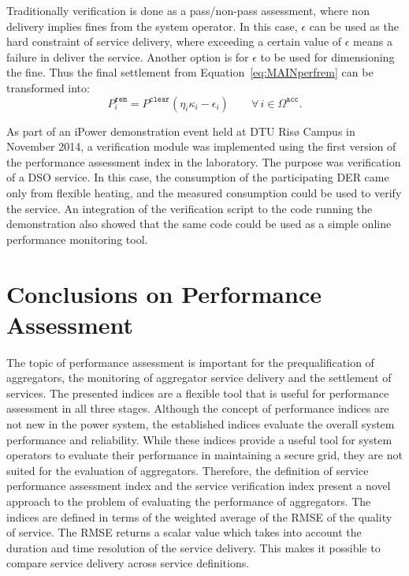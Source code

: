 Traditionally verification is done as a pass/non-pass assessment, where non delivery implies fines from the system operator. In this case, $\epsilon$ can be used as the hard constraint of service delivery, where exceeding a certain value of $\epsilon$ means a failure in deliver the service. Another option is for $\epsilon$ to be used for dimensioning the fine. Thus the final settlement from Equation~\eqref{eq:MAINperfrem} can be transformed into: 
\begin{equation}
	P^\mathtt{rem}_i = P^\mathtt{clear} \left( \eta_i\kappa_i - \epsilon_i \right)  \qquad \forall \, i \in \Omega^\mathtt{acc}.\label{eq:MAINperfrem2eps}
\end{equation}

As part of an iPower demonstration event held at DTU Risø Campus in November 2014, a verification module was implemented using the first version of the performance assessment index in the laboratory. The purpose was verification of a DSO service. In this case, the consumption of the participating DER came only from flexible heating, and the measured consumption could be used to verify the service. An integration of the verification script to the code running the demonstration also showed that the same code could be used as a simple online performance monitoring tool.

\section{Conclusions on Performance Assessment}
The topic of performance assessment is important for the prequalification of aggregators, the monitoring of aggregator service delivery and the settlement of services. The presented indices are a flexible tool that is useful for performance assessment in all three stages. Although the concept of performance indices are not new in the power system, the established indices evaluate the overall system performance and reliability. While these indices provide a useful tool for system operators to evaluate their performance in maintaining a secure grid, they are not suited for the evaluation of aggregators. Therefore, the definition of service performance assessment index and the service verification index present a novel approach to the problem of evaluating the performance of aggregators. The indices are defined in terms of the weighted average of the RMSE of the quality of service. The RMSE returns a scalar value which takes into account the duration and time resolution of the service delivery. This makes it possible to compare service delivery across service definitions.

